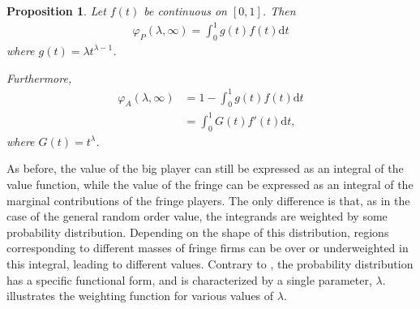 \documentclass[a4paper]{article}
\newtheorem{proposition}{Proposition}
\newcommand{\dt}{\mathrm{d}t}
\begin{document}
\begin{proposition}
    \label{prop:one_sided_weighted}
    Let $f(t)$ be continuous on $[0, 1]$. Then
    \begin{align*}
        \varphi_P(\lambda, \infty) = \int_0^1 g(t) f(t) \dt
    \end{align*}
    where $g(t) = \lambda t^{\lambda - 1}$.

    Furthermore,
    \begin{align*}
        \varphi_A(\lambda, \infty) &= 1 - \int_0^1 g(t) f(t) \dt \\
                                &= \int_0^1 G(t) f'(t) \dt,
    \end{align*}
    where $G(t) = t^\lambda$.
\end{proposition}

As before, the value of the big player can still be expressed as an integral of the value function, while the value of the fringe can be expressed as an integral of the marginal contributions of the fringe players.
The only difference is that, as in the case of the general random order value, the integrands are weighted by some probability distribution.
Depending on the shape of this distribution, regions corresponding to different masses of fringe firms can be over or underweighted in this integral, leading to different values.
Contrary to , the probability distribution has a specific functional form, and is characterized by a single parameter, $\lambda$.
 illustrates the weighting function for various values of $\lambda$.
\end{document}
